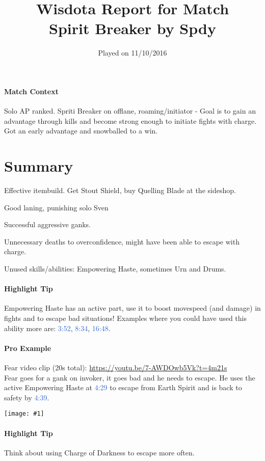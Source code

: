 \documentclass{article}
\title{Wisdota Report for Match \matchid \\
Spirit Breaker by Spdy}
\date{Played on 11/10/2016}
\author{}
\newcommand{\gt}{\ensuremath{\;\;\color{green} \filledmedtriangleup} }
\newcommand{\rt}{\ensuremath{\;\;\color{red} \filledmedtriangledown} }
\newcommand{\ws}{\ensuremath{\;\;\color{white} \filledmedsquare} }
\newenvironment{remarks}
    {
        \begin{description}
            \setlength\itemsep{0em}
    }
    {
        \end{description}
    }
\newcommand{\goodremark}[1]{\item[\gt] #1}
\newcommand{\neutralremark}[1]{\item[\ws] #1}
\newcommand{\badremark}[1]{\item[\rt] #1}
\newcommand{\logref}[1]{\textcolor{highlight}{#1}}
\newcommand{\nnsection}[1]
{\section*{#1}
\addcontentsline{toc}{section}{#1}
}
\newcommand{\bigscreenshot}[1]{
    \begin{center}
    \begin{minipage}[t]{0.9\textwidth}
        \texttt{[image: \#1]}
    \end{minipage}
\end{center}
}
\begin{document}
\pagecolor{WisdotaBackground}
\color{white}

\maketitle
\thispagestyle{first-page}

\paragraph{Match Context}
Solo AP ranked. Spriti Breaker on offlane, roaming/initiator - Goal is to gain an advantage through kills and become strong enough to initiate fights with charge. Got an early advantage and snowballed to a win.

\nnsection{Summary}

\begin{remarks}
\goodremark{Effective itembuild. Get Stout Shield, buy Quelling Blade at the sideshop.}
\goodremark{Good laning, punishing solo Sven}
\goodremark{Successful aggressive ganks.}
\neutralremark{Unnecessary deaths to overconfidence, might have been able to escape with charge.}
\badremark{Unused skills/abilities: Empowering Haste, sometimes Urn and Drums. }
\end{remarks}

\paragraph{Highlight Tip}
Empowering Haste has an active part, use it to boost movespeed (and damage) in fights and to escape bad situations! Examples where you could have used this ability more are: \logref{3:52}, \logref{8:34}, \logref{16:48}.

\paragraph{Pro Example}
Fear video clip (20s total): \url{https://youtu.be/7-AWDOwb5Vk?t=4m21s}\\  
Fear goes for a gank on invoker, it goes bad and he needs to escape. He uses the active Empowering Haste at \logref{4:29} to escape from Earth Spirit and is back to safety by \logref{4:39}.
\bigscreenshot{img/Fear_Empowering_Haste.png}

\paragraph{Highlight Tip}
Think about using Charge of Darkness to escape more often.
\end{document}
